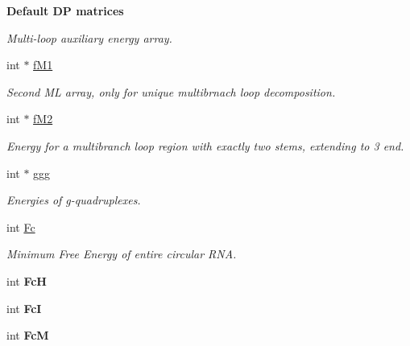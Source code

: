 \begin{Indent}{\bf Default D\+P matrices}
\begin{DoxyCompactItemize}
\begin{DoxyCompactList}\small\item\em Multi-\/loop auxiliary energy array. \end{DoxyCompactList}\item 
\hypertarget{group__dp__matrices_ae4e598d601f5ece6b8b4ffffcae2db06}{}int $\ast$ \hyperlink{group__dp__matrices_ae4e598d601f5ece6b8b4ffffcae2db06}{f\+M1}\label{group__dp__matrices_ae4e598d601f5ece6b8b4ffffcae2db06}

\begin{DoxyCompactList}\small\item\em Second M\+L array, only for unique multibrnach loop decomposition. \end{DoxyCompactList}\item 
\hypertarget{group__dp__matrices_ad29106e37d485b3f20b7be468e6c179c}{}int $\ast$ \hyperlink{group__dp__matrices_ad29106e37d485b3f20b7be468e6c179c}{f\+M2}\label{group__dp__matrices_ad29106e37d485b3f20b7be468e6c179c}

\begin{DoxyCompactList}\small\item\em Energy for a multibranch loop region with exactly two stems, extending to 3\textquotesingle{} end. \end{DoxyCompactList}\item 
\hypertarget{group__dp__matrices_a0b7b86a5c75c96eabb89eb53a13e7164}{}int $\ast$ \hyperlink{group__dp__matrices_a0b7b86a5c75c96eabb89eb53a13e7164}{ggg}\label{group__dp__matrices_a0b7b86a5c75c96eabb89eb53a13e7164}

\begin{DoxyCompactList}\small\item\em Energies of g-\/quadruplexes. \end{DoxyCompactList}\item 
\hypertarget{group__dp__matrices_ac6a22d71c6a0eccedf978372b19b458a}{}int \hyperlink{group__dp__matrices_ac6a22d71c6a0eccedf978372b19b458a}{Fc}\label{group__dp__matrices_ac6a22d71c6a0eccedf978372b19b458a}

\begin{DoxyCompactList}\small\item\em Minimum Free Energy of entire circular R\+N\+A. \end{DoxyCompactList}\item 
\hypertarget{group__dp__matrices_a1ba03c53ee2a32eaf8b46c0eb259e0c4}{}int {\bfseries Fc\+H}\label{group__dp__matrices_a1ba03c53ee2a32eaf8b46c0eb259e0c4}

\item 
\hypertarget{group__dp__matrices_a96ac173770c9745a30823fa17fe0b7f4}{}int {\bfseries Fc\+I}\label{group__dp__matrices_a96ac173770c9745a30823fa17fe0b7f4}

\item 
\hypertarget{group__dp__matrices_a9a4bf70926f79372388eccc7e73759e9}{}int {\bfseries Fc\+M}\label{group__dp__matrices_a9a4bf70926f79372388eccc7e73759e9}

\end{DoxyCompactItemize}
\end{Indent}
